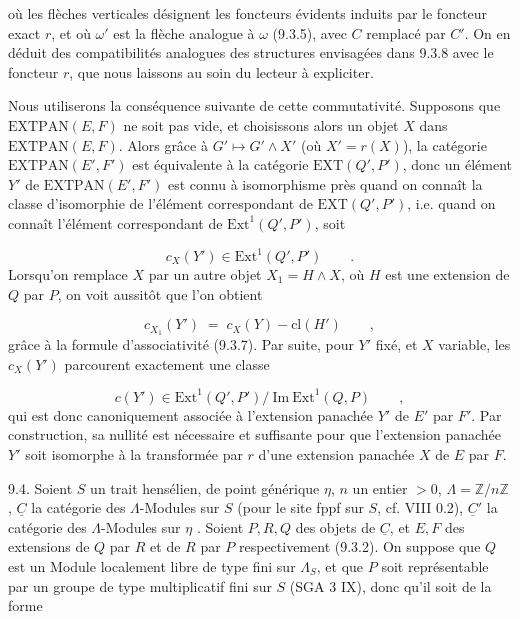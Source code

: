 
où les flèches verticales désignent les foncteurs évidents induits par le foncteur exact $r$, et où $\omega'$ est la flèche analogue à $\omega$ (9.3.5), avec $C$ remplacé par $C'$. On en déduit des compatibilités analogues des structures envisagées dans 9.3.8 avec le foncteur $r$, que nous laissons au soin du lecteur à expliciter.

Nous utiliserons la conséquence suivante de cette commutativité. Supposons que $\mathrm{EXTPAN}(E,F)$ ne soit pas vide, et choisissons alors un objet $X$ dans $\mathrm{EXTPAN}(E,F)$. Alors grâce à $G' \longmapsto G' \wedge X'$ (où $X'=r(X)$), la catégorie $\mathrm{EXTPAN}(E',F')$ est équivalente à la catégorie $\mathrm{EXT}(Q',P')$, donc un élément $Y'$ de $\mathrm{EXTPAN}(E',F')$ est connu à isomorphisme près quand on connaît la classe d'isomorphie de l'élément correspondant de $\mathrm{EXT}(Q',P')$, i.e. quand on connaît l'élément correspondant de $\mathrm{Ext}^1(Q' ,P')$, soit

\begin{equation*}
c_X(Y') \in \mathrm{Ext}^1(Q',P') \qquad .
\end{equation*}
Lorsqu'on remplace $X$ par un autre objet $X_1 = H \wedge X$, où $H$ est une extension de $Q$ par $P$, on voit aussitôt que l'on obtient

\begin{equation*}
c_{X_1}(Y') \;=\; c_X(Y) - \mathrm{cl}(H') \qquad ,
\end{equation*}
grâce à la formule d'associativité (9.3.7). Par suite, pour $Y'$ fixé, et $X$ variable, les $c_X(Y')$ parcourent exactement une classe

\begin{equation}\tag{9.3.13}
c(Y') \in \mathrm{Ext}^1(Q',P')/\ \mathrm{Im}\ \mathrm{Ext}^1(Q,P) \qquad ,
\end{equation}
qui est donc canoniquement associée à l'extension panachée $Y'$ de $E'$ par $F'$. Par construction, sa nullité est nécessaire et suffisante pour que l'extension panachée $Y'$ soit isomorphe à la transformée par $r$ d'une extension panachée $X$ de $E$ par $F$.



9.4. Soient $S$ un trait hensélien, de point générique $\eta$, $n$ un entier $> 0$, $\Lambda = \mathbb{Z}/n\mathbb{Z}$ , $\underline{C}$ la catégorie des $\Lambda$-Modules sur $S$ (pour le site fppf sur $S$, cf. VIII 0.2), $\underline{C}'$ la catégorie des $\Lambda$-Modules sur $\eta$ . Soient $P,R,Q$ des objets de $\underline{C}$, et $E,F$ des extensions de $Q$ par $R$ et de $R$ par $P$ respectivement (9.3.2). On suppose que $Q$ est un Module localement libre de type fini sur $\Lambda_S$, et que $P$ soit représentable par un groupe de type multiplicatif fini sur $S$ (SGA 3 IX), donc qu'il soit de la forme

